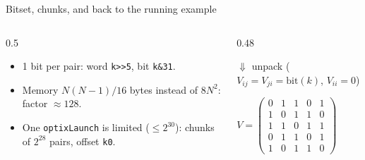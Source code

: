 \documentclass[aspectratio=169,10pt]{beamer}
\begin{document}
\begin{frame}{Bitset, chunks, and back to the running example}
  \begin{columns}[T]
    \begin{column}{0.5\textwidth}
      \begin{itemize}
        \item 1 bit per pair: word \texttt{k>>5}, bit \texttt{k\&31}.
        \item Memory $N(N-1)/16$ bytes instead of $8N^2$: factor $\approx 128$.
        \item One \texttt{optixLaunch} is limited ($\leq 2^{30}$): chunks of $2^{28}$ pairs, offset \texttt{k0}.
      \end{itemize}
    \end{column}

    \begin{column}{0.48\textwidth}
      \centering

      \vspace{3mm}
      $\Downarrow$ unpack ($V_{ij}=V_{ji}=\text{bit}(k)$, $V_{ii}=0$)

      \vspace{1mm}
      $V=\begin{pmatrix}
      0&1&1&0&1\\
      1&0&1&1&0\\
      1&1&0&1&1\\
      0&1&1&0&1\\
      1&0&1&1&0
      \end{pmatrix}$
    \end{column}
  \end{columns}
\end{frame}

\end{document}
